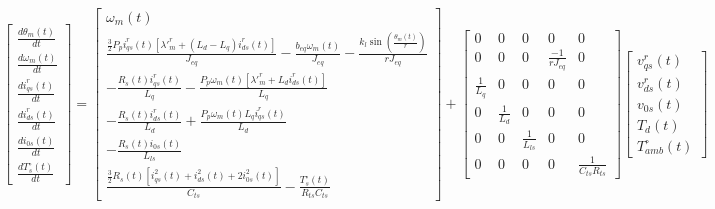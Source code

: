 \documentclass[a4paper, 10pt, onecolumn,journal]{ieeeconf}
\begin{document}
\begin{equation}
    \begin{bmatrix} 
        \frac{d \theta_m(t)}{dt} \\ 
        \frac{d \omega_m(t)}{dt} \\ 
        \frac{d i^r_{qs}(t)}{dt} \\ 
        \frac{d i^r_{ds}(t)}{dt} \\ 
        \frac{d i_{0s}(t)}{dt} \\ 
        \frac{d T^\circ_s(t)}{dt} 
    \end{bmatrix} 
        = 
    \begin{bmatrix} 
        \omega_m(t) \\ 
        \frac{\frac{3}{2} P_p i^r_{qs}(t)\left[\lambda'^r_m + (L_d - L_q) i^r_{ds}(t) \right]}{J_{eq}} - \frac{b_{eq}\omega_m(t)}{J_{eq}} - \frac{k_l\sin\left(\frac{\theta_m(t)}{r}\right)}{rJ_{eq}}\\ 
        -\frac{R_s(t) i^r_{qs}(t)}{L_q} - \frac{P_p \omega_m(t) \left[\lambda'^r_m + L_d i^r_{ds}(t)\right]}{L_q}\\ 
        -\frac{R_s(t) i^r_{ds}(t)}{L_d} + \frac{P_p \omega_m(t) L_q  i^r_{qs}(t)}{L_d}  \\ 
        -\frac{R_s(t) i_{0s}(t) }{L_{ls}} \\ 
        \frac{\frac{3}{2} R_s(t) \left[ i_{qs}^2(t) + i_{ds}^2(t) + 2 i_{0s}^2(t) \right]}{C_{ts}} - \frac{T_s^{\circ}(t)}{R_{ts}C_{ts}}
    \end{bmatrix}
        + 
    \begin{bmatrix} 
        0 & 0 & 0 & 0 & 0 \\ 
        0 & 0 & 0 & \frac{-1}{r J_{eq}} & 0 \\ 
        \frac{1}{L_q} & 0 & 0 & 0 & 0\\ 
        0 & \frac{1}{L_d} & 0 & 0 & 0 \\ 
        0 & 0 & \frac{1}{L_{ls}}  & 0 & 0 \\ 
        0 & 0 & 0 & 0 & \frac{1}{C_{ts} R_{ts}}
    \end{bmatrix} 
    \begin{bmatrix} 
        v^r_{qs}(t) \\ 
        v^r_{ds}(t) \\ 
        v_{0s}(t) \\
        T_d(t) \\ 
        T^{\circ}_{amb}(t)
    \end{bmatrix}
    \label{ecuacion vectorial de estado jacobi}
\end{equation}
\end{document}
